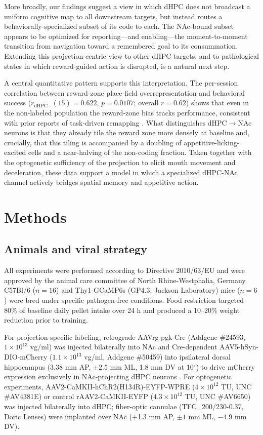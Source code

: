 \documentclass[11pt]{article}
\begin{document}
More broadly, our findings suggest a view in which dHPC does not broadcast a uniform cognitive map to all downstream targets, but instead routes a behaviorally-specialized subset of its code to each. The NAc-bound subset appears to be optimized for reporting---and enabling---the moment-to-moment transition from navigation toward a remembered goal to its consummation. Extending this projection-centric view to other dHPC targets, and to pathological states in which reward-guided action is disrupted, is a natural next step.

A central quantitative pattern supports this interpretation. The per-session correlation between reward-zone place-field overrepresentation and behavioral success ($r_{\text{dHPC}-}(15)=0.622$, $p=0.0107$; overall $r=0.62$) shows that even in the non-labeled population the reward-zone bias tracks performance, consistent with prior reports of task-driven remapping \citep{Mamad2017PlaceField,Kaufman2020LocusCoeruleus,Ambrose2016Replay}. What distinguishes dHPC$\rightarrow$NAc neurons is that they already tile the reward zone more densely at baseline and, crucially, that this tiling is accompanied by a doubling of appetitive-licking-excited cells and a near-halving of the non-coding fraction. Taken together with the optogenetic sufficiency of the projection to elicit mouth movement and deceleration, these data support a model in which a specialized dHPC-NAc channel actively bridges spatial memory and appetitive action.

\section{Methods}

\subsection{Animals and viral strategy}

All experiments were performed according to Directive 2010/63/EU and were approved by the animal care committee of North Rhine-Westphalia, Germany. C57Bl/6 ($n=16$) and Thy1-GCaMP6s (GP4.3; Jackson Laboratory) mice ($n=6$) were bred under specific pathogen-free conditions. Food restriction targeted 80\% of baseline daily pellet intake over 24 h and produced a 10--20\% weight reduction prior to training.

For projection-specific labeling, retrograde AAVrg-pgk-Cre (Addgene \#24593, $1\times10^{13}$ vg/ml) was injected bilaterally into NAc and Cre-dependent AAV5-hSyn-DIO-mCherry ($1.1\times10^{13}$ vg/ml, Addgene \#50459) into ipsilateral dorsal hippocampus (3.38 mm AP, $\pm 2.5$ mm ML, 1.8 mm DV at 10$^\circ$) to drive mCherry expression exclusively in NAc-projecting dHPC neurons \citep{Tervo2016AAVretro}. For optogenetic experiments, AAV2-CaMKII-hChR2(H134R)-EYFP-WPRE ($4\times10^{12}$ TU, UNC \#AV4381E) or control rAAV2-CaMKII-EYFP ($4.3\times10^{12}$ TU, UNC \#AV6650) was injected bilaterally into dHPC; fiber-optic cannulae (TFC\_200/230-0.37, Doric Lenses) were implanted over NAc (+1.3 mm AP, $\pm 1$ mm ML, $-4.9$ mm DV).
\end{document}
